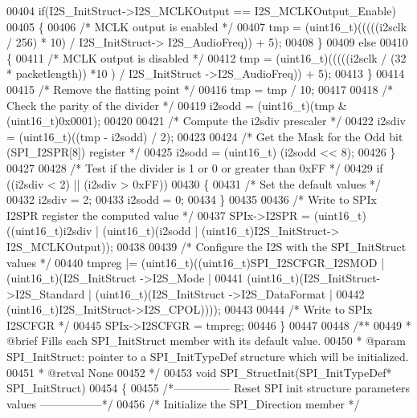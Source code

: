 \begin{DoxyCode}
00404     \textcolor{keywordflow}{if}(I2S\_InitStruct->I2S_MCLKOutput == I2S_MCLKOutput_Enable)
00405     \{
00406       \textcolor{comment}{/* MCLK output is enabled */}
00407       tmp = (uint16\_t)(((((i2sclk / 256) * 10) / I2S\_InitStruct->
      I2S_AudioFreq)) + 5);
00408     \}
00409     \textcolor{keywordflow}{else}
00410     \{
00411       \textcolor{comment}{/* MCLK output is disabled */}
00412       tmp = (uint16\_t)(((((i2sclk / (32 * packetlength)) *10 ) / I2S\_InitStruct
      ->I2S_AudioFreq)) + 5);
00413     \}
00414 
00415     \textcolor{comment}{/* Remove the flatting point */}
00416     tmp = tmp / 10;
00417 
00418     \textcolor{comment}{/* Check the parity of the divider */}
00419     i2sodd = (uint16\_t)(tmp & (uint16\_t)0x0001);
00420 
00421     \textcolor{comment}{/* Compute the i2sdiv prescaler */}
00422     i2sdiv = (uint16\_t)((tmp - i2sodd) / 2);
00423 
00424     \textcolor{comment}{/* Get the Mask for the Odd bit (SPI\_I2SPR[8]) register */}
00425     i2sodd = (uint16\_t) (i2sodd << 8);
00426   \}
00427 
00428   \textcolor{comment}{/* Test if the divider is 1 or 0 or greater than 0xFF */}
00429   \textcolor{keywordflow}{if} ((i2sdiv < 2) || (i2sdiv > 0xFF))
00430   \{
00431     \textcolor{comment}{/* Set the default values */}
00432     i2sdiv = 2;
00433     i2sodd = 0;
00434   \}
00435 
00436   \textcolor{comment}{/* Write to SPIx I2SPR register the computed value */}
00437   SPIx->I2SPR = (uint16\_t)((uint16\_t)i2sdiv | (uint16\_t)(i2sodd | (uint16\_t)I2S\_InitStruct->
      I2S\_MCLKOutput));
00438 
00439   \textcolor{comment}{/* Configure the I2S with the SPI\_InitStruct values */}
00440   tmpreg |= (uint16\_t)((uint16\_t)SPI_I2SCFGR_I2SMOD | (uint16\_t)(I2S\_InitStruct
      ->I2S_Mode |
00441                   (uint16\_t)(I2S\_InitStruct->I2S_Standard | (uint16\_t)(I2S\_InitStruct
      ->I2S_DataFormat |
00442                   (uint16\_t)I2S\_InitStruct->I2S_CPOL))));
00443 
00444   \textcolor{comment}{/* Write to SPIx I2SCFGR */}
00445   SPIx->I2SCFGR = tmpreg;
00446 \}
00447 
00448 \textcolor{comment}{/**}
00449 \textcolor{comment}{  * @brief  Fills each SPI\_InitStruct member with its default value.}
00450 \textcolor{comment}{  * @param  SPI\_InitStruct: pointer to a SPI\_InitTypeDef structure which will be initialized.}
00451 \textcolor{comment}{  * @retval None}
00452 \textcolor{comment}{  */}
00453 \textcolor{keywordtype}{void} SPI_StructInit(SPI\_InitTypeDef* SPI\_InitStruct)
00454 \{
00455 \textcolor{comment}{/*--------------- Reset SPI init structure parameters values -----------------*/}
00456   \textcolor{comment}{/* Initialize the SPI\_Direction member */}

\end{DoxyCode}
